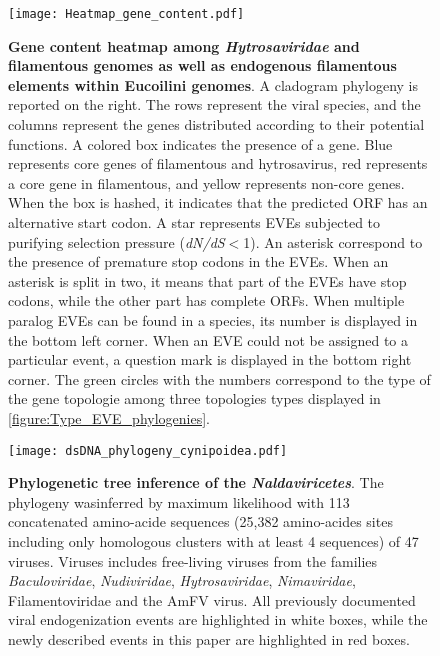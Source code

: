 \begin{landscape}

\begin{figure}[!htpbt]
\texttt{[image: Heatmap\_gene\_content.pdf]}\centering
\caption[Paper3:Filamentous EVEs distribution in Eucoilini]{\footnotesize\textbf{Gene content heatmap among \textit{Hytrosaviridae} and filamentous genomes as well as endogenous filamentous elements within Eucoilini genomes}. A cladogram phylogeny is reported on the right. The rows represent the viral species, and the columns represent the genes distributed according to their potential functions. A colored box indicates the presence of a gene. Blue represents core genes of filamentous and hytrosavirus, red represents a  core gene in filamentous, and yellow represents non-core genes. When the box is hashed, it indicates that the predicted ORF has an alternative start codon. A star represents EVEs subjected to purifying selection pressure (\textit{dN/dS}$<$1). An asterisk correspond to the presence of premature stop codons in the EVEs. When an asterisk is split in two, it means that part of the EVEs have stop codons, while the other part has complete ORFs. When multiple paralog EVEs can be found in a species,  its number is displayed in the bottom left corner. When an EVE could not be assigned to a particular event, a question mark is displayed in the bottom right corner. The green circles with the numbers correspond to the type of the gene topologie among three topologies types displayed in \figurename{\ref{figure:Type_EVE_phylogenies}}.}
\label{figure:Heatmap_gene_content}
\end{figure}

\end{landscape}

\begin{figure}[!htpbt]
\texttt{[image: dsDNA\_phylogeny\_cynipoidea.pdf]}\centering
\caption[Paper3:\textit{Naldaviricetes} phylogenenetic tree including Eucoilini]{\textbf{Phylogenetic tree inference of the \textit{Naldaviricetes}}. The phylogeny wasinferred by maximum likelihood with 113 concatenated amino-acide sequences (25,382 amino-acides sites including only homologous clusters with at least 4 sequences) of 47 viruses. Viruses includes free-living viruses from the families \textit{Baculoviridae}, \textit{Nudiviridae}, \textit{Hytrosaviridae}, \textit{Nimaviridae}, Filamentoviridae and the AmFV virus. 
All previously documented viral endogenization events are highlighted in white boxes, while the newly described events in this paper are highlighted in red boxes.}
\label{figure:dsDNA_phylogeny_cynipoidea}
\end{figure}

